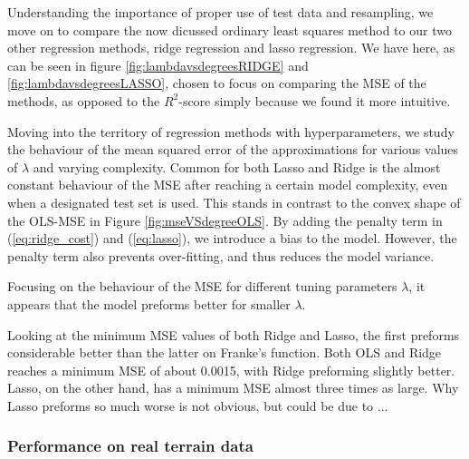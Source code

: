 Understanding the importance of proper use of test data and resampling, we move on to compare the now dicussed ordinary least squares method to our two other regression methods, ridge regression and lasso regression. We have here, as can be seen in figure \ref{fig:lambdavsdegreesRIDGE} and \ref{fig:lambdavsdegreesLASSO}, chosen to focus on comparing the MSE of the methods, as opposed to the $R^2$-score simply because we found it more intuitive.

Moving into the territory of regression methods with hyperparameters, we study the behaviour of the mean squared error of the approximations for various values of $\lambda$ and varying complexity. 
Common for both Lasso and Ridge is the almost constant behaviour of the MSE after reaching a certain model complexity, even when a designated test set is used. This stands in contrast to the convex shape of the OLS-MSE in Figure \ref{fig:mseVSdegreeOLS}. By adding the penalty term in (\ref{eq:ridge_cost}) and (\ref{eq:lasso}), we introduce a bias to the model. However, the penalty term also prevents over-fitting, and thus reduces the model variance. 

Focusing on the behaviour of the MSE for different tuning parameters $\lambda$, it appears that the model preforms better for smaller $\lambda$. 

Looking at the minimum MSE values of both Ridge and Lasso, the first preforms considerable better than the latter on Franke's function. Both OLS and Ridge reaches a minimum MSE of about 0.0015, with Ridge preforming slightly better. Lasso, on the other hand, has a minimum MSE almost three times as large. Why Lasso preforms so much worse is not obvious, but could be due to ...


\subsubsection*{Performance on real terrain data}